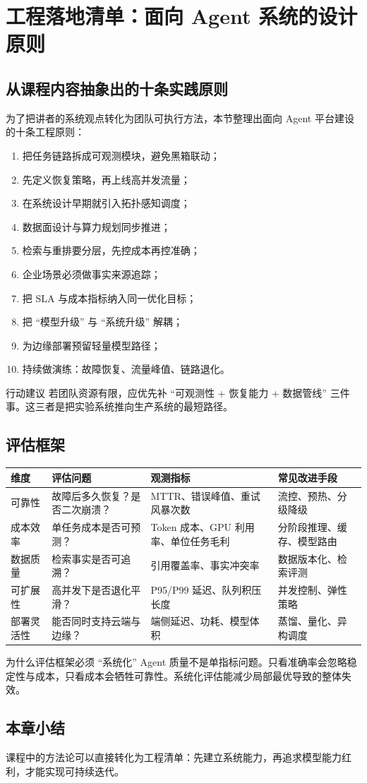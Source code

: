 \section{工程落地清单：面向 Agent 系统的设计原则}

\subsection{从课程内容抽象出的十条实践原则}
为了把讲者的系统观点转化为团队可执行方法，本节整理出面向 Agent 平台建设的十条工程原则：
\begin{enumerate}
    \item 把任务链路拆成可观测模块，避免黑箱联动；
    \item 先定义恢复策略，再上线高并发流量；
    \item 在系统设计早期就引入拓扑感知调度；
    \item 数据面设计与算力规划同步推进；
    \item 检索与重排要分层，先控成本再控准确；
    \item 企业场景必须做事实来源追踪；
    \item 把 SLA 与成本指标纳入同一优化目标；
    \item 把 ``模型升级'' 与 ``系统升级'' 解耦；
    \item 为边缘部署预留轻量模型路径；
    \item 持续做演练：故障恢复、流量峰值、链路退化。
\end{enumerate}

\begin{importantbox}{行动建议}
若团队资源有限，应优先补 ``可观测性 + 恢复能力 + 数据管线'' 三件事。这三者是把实验系统推向生产系统的最短路径。
\end{importantbox}

\subsection{评估框架}
\begin{longtable}{p{2.4cm}p{3.7cm}p{3.6cm}p{3.2cm}}
\toprule
\textbf{维度} & \textbf{评估问题} & \textbf{观测指标} & \textbf{常见改进手段} \\
\midrule
可靠性 & 故障后多久恢复？是否二次崩溃？ & MTTR、错误峰值、重试风暴次数 & 流控、预热、分级降级 \\
成本效率 & 单任务成本是否可预测？ & Token 成本、GPU 利用率、单位任务毛利 & 分阶段推理、缓存、模型路由 \\
数据质量 & 检索事实是否可追溯？ & 引用覆盖率、事实冲突率 & 数据版本化、检索评测 \\
可扩展性 & 高并发下是否退化平滑？ & P95/P99 延迟、队列积压长度 & 并发控制、弹性策略 \\
部署灵活性 & 能否同时支持云端与边缘？ & 端侧延迟、功耗、模型体积 & 蒸馏、量化、异构调度 \\
\bottomrule
\end{longtable}

\begin{knowledgebox}{为什么评估框架必须 ``系统化''}
Agent 质量不是单指标问题。只看准确率会忽略稳定性与成本，只看成本会牺牲可靠性。系统化评估能减少局部最优导致的整体失效。
\end{knowledgebox}

\subsection{本章小结}
课程中的方法论可以直接转化为工程清单：先建立系统能力，再追求模型能力红利，才能实现可持续迭代。

